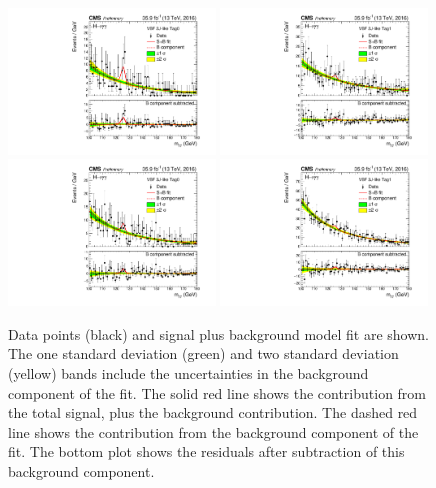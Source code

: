 \begin{figure}[hptb]
  \centering
  \includegraphics[width=0.49\textwidth]{Figures/Appendices/_forAppendix2016ch1_RECO_VBFTOPO_JET3VETO_Tag0_13TeV.pdf}
  \includegraphics[width=0.49\textwidth]{Figures/Appendices/_forAppendix2016ch1_RECO_VBFTOPO_JET3VETO_Tag1_13TeV.pdf}
  \includegraphics[width=0.49\textwidth]{Figures/Appendices/_forAppendix2016ch1_RECO_VBFTOPO_JET3_Tag0_13TeV.pdf}
  \includegraphics[width=0.49\textwidth]{Figures/Appendices/_forAppendix2016ch1_RECO_VBFTOPO_JET3_Tag1_13TeV.pdf}
  \caption[Signal plus background fits to data.]
  {
    Data points (black) and signal plus background model fit are shown. 
    The one standard deviation (green) and two standard deviation (yellow) bands 
    include the uncertainties in the background component of the fit. 
    The solid red line shows the contribution from the total signal, plus the background contribution. 
    The dashed red line shows the contribution from the background component of the fit. 
    The bottom plot shows the residuals after subtraction of this background component.
  }
\end{figure}

